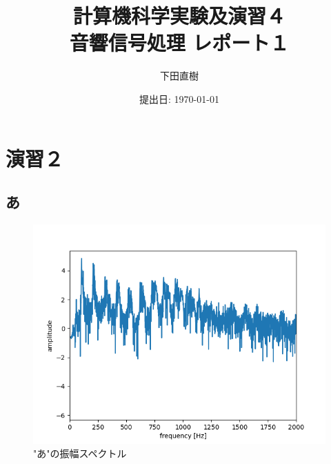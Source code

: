 \documentclass[a4paper,11pt]{jsarticle}
\begin{document}
\title{
  計算機科学実験及演習４	\\   %
  \large{音響信号処理 レポート１}	%
}
\author{下田直樹}
\date{提出日: \today}
\maketitle

\tableofcontents
\clearpage

\section{演習２}
\subsection*{あ}
\begin{figure}[H]
  \centering
  \includegraphics[scale=0.5]{../ex02/img/plot-spectrum-2000_a.png}
  \caption{"あ"の振幅スペクトル}
  \label{spectrum_a}
\end{figure}
\end{document}
